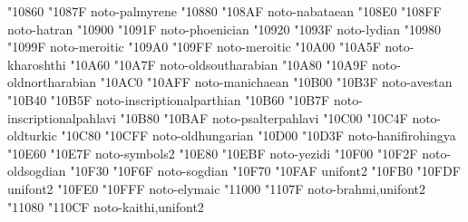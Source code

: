 \documentclass{article}
\begin{document}
                                          { "10860} { "1087F} {noto-palmyrene}
                                          { "10880} { "108AF} {noto-nabataean}
                                             { "108E0} { "108FF} {noto-hatran}
                                         { "10900} { "1091F} {noto-phoenician}
                                             { "10920} { "1093F} {noto-lydian}
                               { "10980} { "1099F} {noto-meroitic}
                                   { "109A0} { "109FF} {noto-meroitic}
                                         { "10A00} { "10A5F} {noto-kharoshthi}
                                  { "10A60} { "10A7F} {noto-oldsoutharabian}
                                  { "10A80} { "10A9F} {noto-oldnortharabian}
                                         { "10AC0} { "10AFF} {noto-manichaean}
                                            { "10B00} { "10B3F} {noto-avestan}
                             { "10B40} { "10B5F} {noto-inscriptionalparthian}
                              { "10B60} { "10B7F} {noto-inscriptionalpahlavi}
                                    { "10B80} { "10BAF} {noto-psalterpahlavi}
                                         { "10C00} { "10C4F} {noto-oldturkic}
                                      { "10C80} { "10CFF} {noto-oldhungarian}
                                    { "10D00} { "10D3F} {noto-hanifirohingya}
                               { "10E60} { "10E7F} {noto-symbols2}
                                             { "10E80} { "10EBF} {noto-yezidi}
                                        { "10F00} { "10F2F} {noto-oldsogdian}
                                            { "10F30} { "10F6F} {noto-sogdian}
                                         { "10F70} { "10FAF} {unifont2}
                                         { "10FB0} { "10FDF} {unifont2}
                                            { "10FE0} { "10FFF} {noto-elymaic}
                                             { "11000} { "1107F} {noto-brahmi,unifont2}
                                             { "11080} { "110CF} {noto-kaithi,unifont2}
\end{document}
